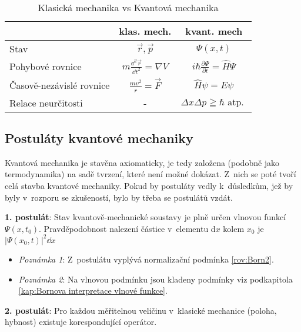 \begin{table}
\centering
\caption{Klasická mechanika vs Kvantová mechanika}
\renewcommand{\arraystretch}{1.8}
\begin{tabular}{p{7cm}cc}
\toprule
 & klas. mech. & kvant. mech\\
\midrule
Stav &$\vec{r}, \vec{p}$  & $\Psi(x,t)$ \\
Pohybové rovnice & $m\frac{\dd ^2 \vec{r}}{\dd t^2} = \nabla V$ & $ i\hbar\frac{\partial \Psi}{\partial t} = \hat{H}\Psi$\\
Časově-nezávislé rovnice & $\frac{mv^2}{r} = \vec{F} $ & $\hat{H}\psi = E\psi$ \\
Relace neurčitosti & - & $\Delta x \Delta p \geqq \hbar \mbox {          atp. }$ \\
\bottomrule
\end{tabular}
\end{table}


\subsection{Postuláty kvantové mechaniky}

Kvantová mechanika je stavěna axiomaticky, je tedy založena (podobně jako termodynamika) na sadě tvrzení, které není možné dokázat. Z~nich se poté tvoří celá stavba kvantové mechaniky. Pokud by postuláty vedly k~důsledkům, jež by byly v~rozporu se zkušeností, bylo by třeba se postulátů vzdát.

{\bf 1. postulát}: Stav kvantově-mechanické soustavy je plně určen vlnovou funkcí $\Psi(x,t_0)$. Pravděpodobnost nalezení částice v~elementu d$x$ kolem $x_0$ je  $|\Psi(x_0,t)|^2\dd x$

\begin{itemize}
\item \textit{Poznámka 1}: Z~postulátu vyplývá normalizační podmínka \ref{rov:Born2}.
\item \textit{Poznámka 2}: Na vlnovou podmínku jsou kladeny podmínky viz podkapitola \ref{kap:Bornova interpretace vlnové funkce}.
\end{itemize}

{\bf 2. postulát}: Pro každou měřitelnou veličinu v~klasické mechanice (poloha, hybnost) existuje korespondující operátor.

